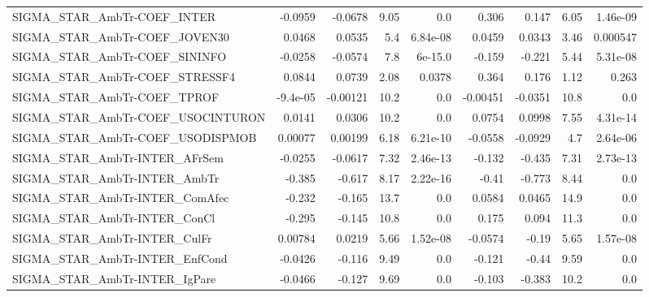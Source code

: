 \begin{tabular}{lrrrrrrrr}
SIGMA\_STAR\_AmbTr-COEF\_INTER           &     -0.0959 &      -0.0678 &     9.05 &      0.0 &      0.306 &       0.147 &         6.05 &      1.46e-09 \\
SIGMA\_STAR\_AmbTr-COEF\_JOVEN30         &      0.0468 &       0.0535 &      5.4 & 6.84e-08 &     0.0459 &      0.0343 &         3.46 &      0.000547 \\
SIGMA\_STAR\_AmbTr-COEF\_SININFO         &     -0.0258 &      -0.0574 &      7.8 &  6e-15.0 &     -0.159 &      -0.221 &         5.44 &      5.31e-08 \\
SIGMA\_STAR\_AmbTr-COEF\_STRESSF4        &      0.0844 &       0.0739 &     2.08 &   0.0378 &      0.364 &       0.176 &         1.12 &         0.263 \\
SIGMA\_STAR\_AmbTr-COEF\_TPROF           &    -9.4e-05 &     -0.00121 &     10.2 &      0.0 &   -0.00451 &     -0.0351 &         10.8 &           0.0 \\
SIGMA\_STAR\_AmbTr-COEF\_USOCINTURON     &      0.0141 &       0.0306 &     10.2 &      0.0 &     0.0754 &      0.0998 &         7.55 &      4.31e-14 \\
SIGMA\_STAR\_AmbTr-COEF\_USODISPMOB      &     0.00077 &      0.00199 &     6.18 & 6.21e-10 &    -0.0558 &     -0.0929 &          4.7 &      2.64e-06 \\
SIGMA\_STAR\_AmbTr-INTER\_AFrSem         &     -0.0255 &      -0.0617 &     7.32 & 2.46e-13 &     -0.132 &      -0.435 &         7.31 &      2.73e-13 \\
SIGMA\_STAR\_AmbTr-INTER\_AmbTr          &      -0.385 &       -0.617 &     8.17 & 2.22e-16 &      -0.41 &      -0.773 &         8.44 &           0.0 \\
SIGMA\_STAR\_AmbTr-INTER\_ComAfec        &      -0.232 &       -0.165 &     13.7 &      0.0 &     0.0584 &      0.0465 &         14.9 &           0.0 \\
SIGMA\_STAR\_AmbTr-INTER\_ConCl          &      -0.295 &       -0.145 &     10.8 &      0.0 &      0.175 &       0.094 &         11.3 &           0.0 \\
SIGMA\_STAR\_AmbTr-INTER\_CulFr          &     0.00784 &       0.0219 &     5.66 & 1.52e-08 &    -0.0574 &       -0.19 &         5.65 &      1.57e-08 \\
SIGMA\_STAR\_AmbTr-INTER\_EnfCond        &     -0.0426 &       -0.116 &     9.49 &      0.0 &     -0.121 &       -0.44 &         9.59 &           0.0 \\
SIGMA\_STAR\_AmbTr-INTER\_IgPare         &     -0.0466 &       -0.127 &     9.69 &      0.0 &     -0.103 &      -0.383 &         10.2 &           0.0 \\

\end{tabular}
